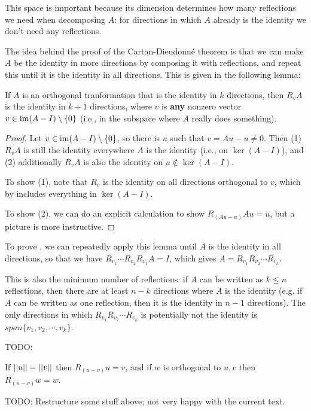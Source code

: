 This space is important because its dimension determines how many reflections we need when decomposing $A$: for directions in which $A$ already is the identity we don't need any reflections.

The idea behind the proof of the Cartan-Dieudonné theorem is that we can make $A$ be the identity in more directions by composing it with reflections, and repeat this until it is the identity in all directions.
This is given in the following lemma:

\begin{lemma}
  If $A$ is an orthogonal tranformation that is the identity in $k$ directions, then $R_v A$ is the identity in $k+1$ directions, where $v$ is \textbf{any} nonzero vector $v \in \operatorname{im}(A - I) \setminus \{ 0 \}$ (i.e., in the subspace where $A$ really does something).
\end{lemma}
\begin{proof}
  Let $v \in \operatorname{im}(A-I) \setminus \{ 0 \}$, so there is $u$ such that $v = Au - u \neq 0$.
  Then (1) $R_v A$ is still the identity everywhere $A$ is the identity (i.e., on $\ker(A - I)$), and (2) additionally $R_v A$ is also the identity on $u \notin \ker(A - I)$.

  To show (1), note that $R_v$ is the identity on all directions orthogonal to $v$, which by  includes everything in $\ker(A - I)$.

  To show (2), we can do an explicit calculation to show $R_{(Au - u)}Au = u$, but a picture is more instructive.
\end{proof}

To prove , we can repeatedly apply this lemma until $A$ is the identity in all directions, so that we have $R_{v_k} \cdots R_{v_2} R_{v_1} A = I$, which gives $A = R_{v_1} R_{v_2} \cdots R_{v_k}$.

This is also the minimum number of reflections: if $A$ can be written as $k \leq n$ reflections, then there are at least $n - k$ directions where $A$ is the identity (e.g. if $A$ can be written as one reflection, then it is the identity in $n - 1$ directions).
The only directions in which $R_{v_1} R_{v_2} \cdots R_{v_k}$ is potentially not the identity is $span \{v_1, v_2, \cdots, v_k\}$.

TODO:

\begin{lemma}
  If $||u|| = ||v||$ then $R_{(u - v)}u = v$, and if $w$ is orthogonal to $u,v$ then $R_{(u-v)}w = w$.
\end{lemma}

TODO:
Restructure some stuff above; not very happy with the current text.


% 
% 


